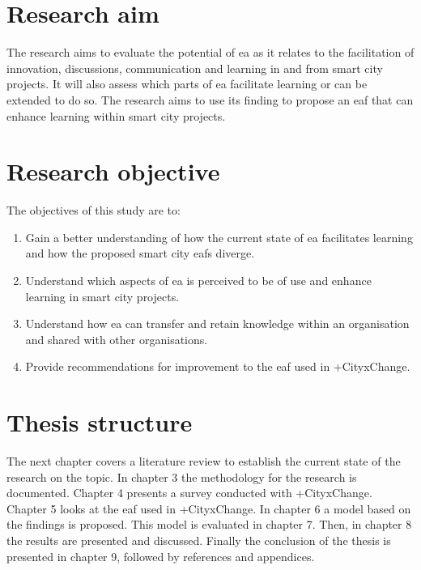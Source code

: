 \section{Research aim}

The research aims to evaluate the potential of \gls{ea} as it relates to the facilitation of innovation, discussions, communication and learning in and from smart city projects. It will also assess which parts of \gls{ea} facilitate learning or can be extended to do so. 
The research aims to use its finding to propose an \gls{eaf} that can enhance learning within smart city projects.

\section{Research objective} %

The objectives of this study are to:
\begin{enumerate}[label=\textbf{RO\arabic*:}, wide=1em, leftmargin=4em, labelsep=*]
    \item Gain a better understanding of how the current state of \gls{ea} facilitates learning and how the proposed smart city \glspl{eaf} diverge. 
    \item Understand which aspects of \gls{ea} is perceived to be of use and enhance learning in smart city projects. %
    \item Understand how \gls{ea} can transfer and retain knowledge within an organisation and shared with other organisations.
    \item Provide recommendations for improvement to the \gls{eaf} used in +CityxChange.
\end{enumerate}

\section{Thesis structure}
The next chapter covers a literature review to establish the current state of the research on the topic. In chapter 3 the methodology for the research is documented. Chapter 4 presents a survey conducted with +CityxChange. Chapter 5 looks at the \gls{eaf} used in +CityxChange. In chapter 6 a model based on the findings is proposed. This model is evaluated in chapter 7. Then, in chapter 8 the results are presented and discussed. Finally the conclusion of the thesis is presented in chapter 9, followed by references and appendices.